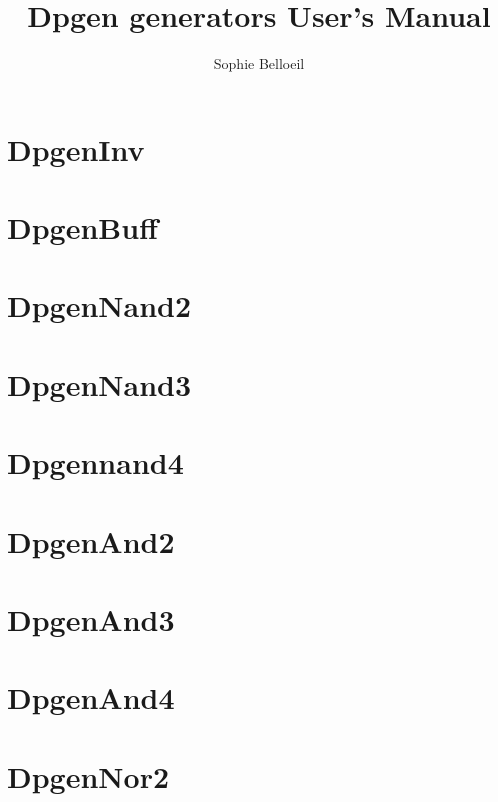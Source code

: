 \documentclass[12pt]{article}
\date   {}
\title  {Dpgen generators User's Manual}
\author {Sophie Belloeil}
\begin{document}
\setlength{\footrulewidth}{0.6pt}
\maketitle


\tableofchildlinks
\htmlrule

\section{DpgenInv} 

\section{DpgenBuff} 

\section{DpgenNand2} 

\section{DpgenNand3} 

\section{Dpgennand4}

\section{DpgenAnd2}

\section{DpgenAnd3} 

\section{DpgenAnd4} 

\section{DpgenNor2} 

\end{document}
